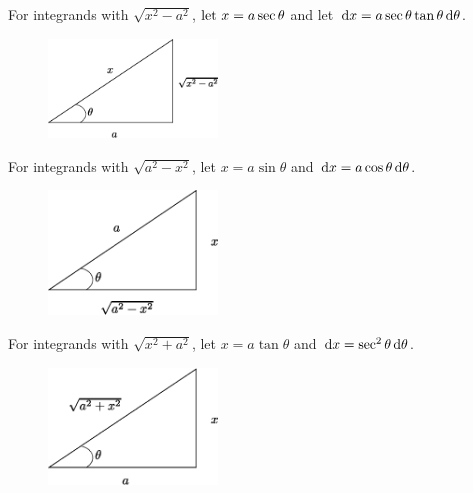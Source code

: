 For integrands with $ \sqrt{x^{2}-a^{2}}$, $\text{let } x=a\sec \theta$ and let $\,\mathrm{d} x = a \sec \theta \tan \theta \,\mathrm{d} \theta $.
\begin{figure}[H]
  \begin{center}
    \includegraphics[width=0.4\textwidth]{continuous/integration/asectheta}
  \end{center}
\end{figure}
For integrands with $\sqrt{a^2-x^2}$, let $x=a \sin \theta$ and $\,\mathrm{d} x = a \cos \theta \,\mathrm{d} \theta$.
\begin{figure}[H]
  \begin{center}
    \includegraphics[width=0.4\textwidth]{continuous/integration/asintheta}
  \end{center}
\end{figure}
For integrands with $ \sqrt{x^2+a^2}$, let $x = a \tan \theta$ and $\,\mathrm{d} x = \sec^2 \theta \,\mathrm{d} \theta$.
\begin{figure}[H]
  \begin{center}
    \includegraphics[width=0.4\textwidth]{continuous/integration/atantheta}
  \end{center}
\end{figure}

